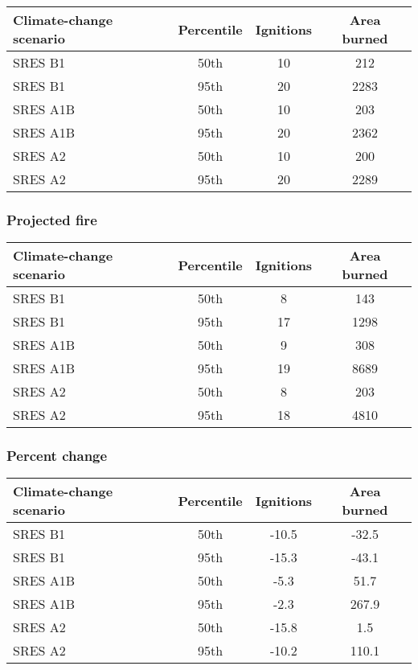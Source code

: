 \documentclass{article}\usepackage[]{graphicx}\usepackage[]{color}
\newcommand{\headcol}{\rowcolor{tableheadcolor}}
\begin{document}
\begin{table}[ht]
\centering
\begin{tabular}{lccc}
  \headcol 
 \toprule
Climate-change scenario & Percentile & Ignitions & Area burned \\ 
  \midrule
SRES B1 & 50th & 10 & 212 \\ 
  SRES B1 & 95th & 20 & 2283 \\ 
  SRES A1B & 50th & 10 & 203 \\ 
  SRES A1B & 95th & 20 & 2362 \\ 
  SRES A2 & 50th & 10 & 200 \\ 
  SRES A2 & 95th & 20 & 2289 \\ 
   \bottomrule
\end{tabular}
\end{table}


\subsubsection{Projected fire}

\begin{table}[ht]
\centering
\begin{tabular}{lccc}
  \headcol 
 \toprule
Climate-change scenario & Percentile & Ignitions & Area burned \\ 
  \midrule
SRES B1 & 50th & 8 & 143 \\ 
  SRES B1 & 95th & 17 & 1298 \\ 
  SRES A1B & 50th & 9 & 308 \\ 
  SRES A1B & 95th & 19 & 8689 \\ 
  SRES A2 & 50th & 8 & 203 \\ 
  SRES A2 & 95th & 18 & 4810 \\ 
   \bottomrule
\end{tabular}
\end{table}


\subsubsection{Percent change}

\begin{table}[ht]
\centering
\begin{tabular}{lccc}
  \headcol 
 \toprule
Climate-change scenario & Percentile & Ignitions & Area burned \\ 
  \midrule
SRES B1 & 50th & -10.5 & -32.5 \\ 
  SRES B1 & 95th & -15.3 & -43.1 \\ 
  SRES A1B & 50th & -5.3 & 51.7 \\ 
  SRES A1B & 95th & -2.3 & 267.9 \\ 
  SRES A2 & 50th & -15.8 & 1.5 \\ 
  SRES A2 & 95th & -10.2 & 110.1 \\ 
   \bottomrule
\end{tabular}
\end{table}
\end{document}
